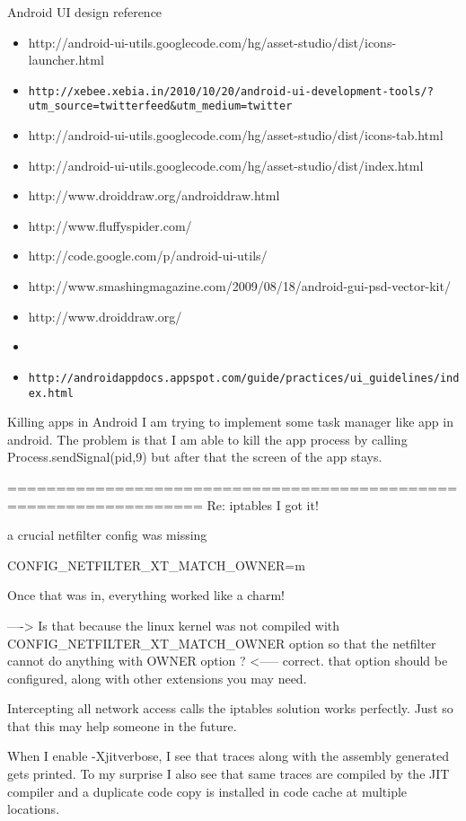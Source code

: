 \documentclass{book}
\begin{document}
\begin{CJK}{UTF8}{gbsn}
 Android UI design reference
\begin{itemize}
\item http://android-ui-utils.googlecode.com/hg/asset-studio/dist/icons-launcher.html
\item \verb|http://xebee.xebia.in/2010/10/20/android-ui-development-tools/?utm_source=twitterfeed&utm_medium=twitter|
\item http://android-ui-utils.googlecode.com/hg/asset-studio/dist/icons-tab.html
\item http://android-ui-utils.googlecode.com/hg/asset-studio/dist/index.html
\item http://www.droiddraw.org/androiddraw.html
\item http://www.fluffyspider.com/
\item http://code.google.com/p/android-ui-utils/
\item http://www.smashingmagazine.com/2009/08/18/android-gui-psd-vector-kit/
\item http://www.droiddraw.org/
\item 
\item \verb|http://androidappdocs.appspot.com/guide/practices/ui_guidelines/index.html|
    \end{itemize}


\iffalse

	Killing apps in Android
I am trying to implement some task manager like app in android. The problem is
that I am able to kill the app process by calling Process.sendSignal(pid,9)
but after that the screen of the app stays.


==================================================================
Re: iptables
I got it!

a crucial netfilter config was missing

CONFIG_NETFILTER_XT_MATCH_OWNER=m

Once that was in, everything worked like a charm!


---->
Is that because the linux kernel was not compiled with CONFIG_NETFILTER_XT_MATCH_OWNER option so that the netfilter cannot do anything with OWNER option ?
<-----
correct.
that option should be configured, along with other extensions you may
need.

Intercepting all network access calls
the iptables solution works perfectly.
Just so that this may help someone in the future.


When I enable -Xjitverbose, I see that traces along with the assembly
generated gets printed. To my surprise I also see that same traces are
compiled by the JIT compiler and a duplicate code copy is installed in
code cache at multiple locations.


\end{CJK}
\end{document}
